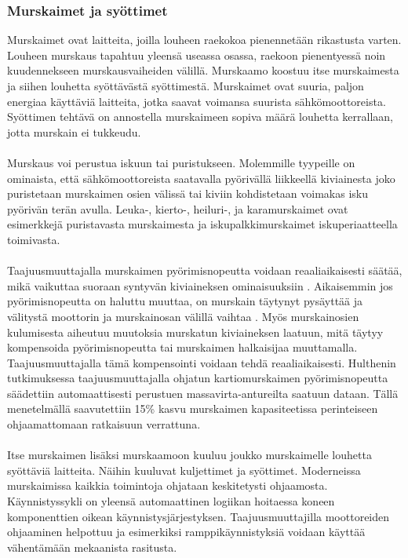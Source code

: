\documentclass[finnish,12pt,a4paper,pdftex,elec,utf8]{aaltothesis}
\begin{document}
\subsubsection{Murskaimet ja syöttimet} %
Murskaimet ovat laitteita, joilla louheen raekokoa pienennetään rikastusta varten. Louheen murskaus tapahtuu yleensä useassa osassa, raekoon pienentyessä noin kuudennekseen murskausvaiheiden välillä. Murskaamo koostuu itse murskaimesta ja siihen louhetta syöttävästä syöttimestä. Murskaimet ovat suuria, paljon energiaa käyttäviä laitteita, jotka saavat voimansa suurista sähkömoottoreista. Syöttimen tehtävä on annostella murskaimeen sopiva määrä louhetta kerrallaan, jotta murskain ei tukkeudu. \cite[s. 198-199]{Hakapää}
\\\\
Murskaus voi perustua iskuun tai puristukseen. Molemmille tyypeille on ominaista, että sähkömoottoreista saatavalla pyörivällä liikkeellä kiviainesta joko puristetaan murskaimen osien välissä tai kiviin kohdistetaan voimakas isku pyörivän terän avulla. Leuka-, kierto-, heiluri-, ja karamurskaimet ovat esimerkkejä puristavasta murskaimesta ja iskupalkkimurskaimet iskuperiaatteella toimivasta. \cite[s. 200-203]{Hakapää}
\\\\
Taajuusmuuttajalla murskaimen pyörimisnopeutta voidaan reaaliaikaisesti säätää, mikä vaikuttaa suoraan syntyvän kiviaineksen ominaisuuksiin \cite{Hulthen}. Aikaisemmin jos pyörimisnopeutta on haluttu muuttaa, on murskain täytynyt pysäyttää ja välitystä moottorin ja murskainosan välillä vaihtaa \cite{MetsoHaastattelu}. Myös murskainosien kulumisesta aiheutuu muutoksia murskatun kiviaineksen laatuun, mitä täytyy kompensoida pyörimisnopeutta tai murskaimen halkaisijaa muuttamalla. Taajuusmuuttajalla tämä kompensointi voidaan tehdä reaaliaikaisesti. Hulthenin tutkimuksessa \cite{Hulthen} taajuusmuuttajalla ohjatun kartiomurskaimen pyörimisnopeutta säädettiin automaattisesti perustuen massavirta-antureilta saatuun dataan. Tällä menetelmällä saavutettiin 15\% kasvu murskaimen kapasiteetissa perinteiseen ohjaamattomaan ratkaisuun verrattuna.
\\\\
Itse murskaimen lisäksi murskaamoon kuuluu joukko murskaimelle louhetta syöttäviä laitteita. Näihin kuuluvat kuljettimet ja syöttimet. Moderneissa murskaimissa kaikkia toimintoja ohjataan keskitetysti ohjaamosta. Käynnistyssykli on yleensä automaattinen logiikan hoitaessa koneen komponenttien oikean käynnistysjärjestyksen. Taajuusmuuttajilla moottoreiden ohjaaminen helpottuu ja esimerkiksi ramppikäynnistyksiä voidaan käyttää vähentämään mekaanista rasitusta. \cite{MetsoHaastattelu} 
\end{document}
